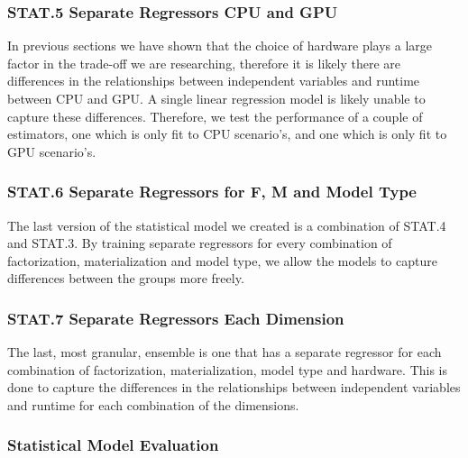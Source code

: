 \subsubsection*{STAT.5 Separate Regressors CPU and GPU}
In previous sections we have shown that the choice of hardware plays a large factor in the trade-off we are researching, therefore it is likely there are differences in the relationships between independent variables and runtime between CPU and GPU. A single linear regression model is likely unable to capture these differences. Therefore, we test the performance of a couple of estimators, one which is only fit to CPU scenario's, and one which is only fit to GPU scenario's.

\subsubsection*{STAT.6 Separate Regressors for F, M and Model Type}
The last version of the statistical model we created is a combination of STAT.4 and STAT.3. By training separate regressors for every combination of factorization, materialization and model type, we allow the models to capture differences between the groups more freely.

\subsubsection*{STAT.7 Separate Regressors Each Dimension}
The last, most granular, ensemble is one that has a separate regressor for each combination of factorization, materialization, model type and hardware. This is done to capture the differences in the relationships between independent variables and runtime for each combination of the dimensions.


\subsubsection{Statistical Model Evaluation}

